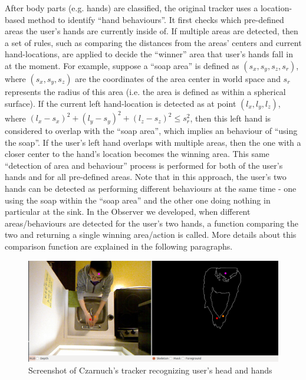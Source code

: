 After body parts (e.g. hands) are classified, the original tracker uses a location-based method to identify ``hand behaviours''. It first checks which pre-defined areas the user's hands are currently inside of. If multiple areas are detected, then a set of rules, such as comparing the distances from the areas' centers and current hand-locations, are applied to decide the ``winner'' area that user's hands fall in at the moment. For example, suppose a ``soap area'' is defined as $(s_{x}, s_{y}, s_{z}, s_{r})$, where $(s_{x}, s_{y}, s_{z})$ are the coordinates of the area center in world space and $s_{r}$ represents the radius of this area (i.e. the area is defined as within a spherical surface). If the current left hand-location is detected as at point $(l_{x}, l_{y}, l_{z})$, where $(l_{x}-s_{x})^{2} + (l_{y}-s_{y})^{2} + (l_{z}-s_{z})^{2} \leqslant s_{r}^{2}$, then this left hand is considered to overlap with the ``soap area'', which implies an behaviour of ``using the soap''. If the user's left hand overlaps with multiple areas, then the one with a closer center to the hand's location becomes the winning area. This same ``detection of area and behaviour'' process is performed for both of the user's hands and for all pre-defined areas. Note that in this approach, the user's two hands can be detected as performing different behaviours at the same time - one using the soap within the ``soap area'' and the other one doing nothing in particular at the sink. In the Observer we developed, when different areas/behaviours are detected for the user's two hands, a function comparing the two and returning a single winning area/action is called. More details about this comparison function are explained in the following paragraphs.

%
\begin{figure}[htb]
\centering
\includegraphics[width=0.9\linewidth]{fig/handtracker-performance.png}
\caption{Screenshot of Czarnuch's tracker recognizing user's head and hands}
\label{fig:handtracker-performance}
\end{figure}

